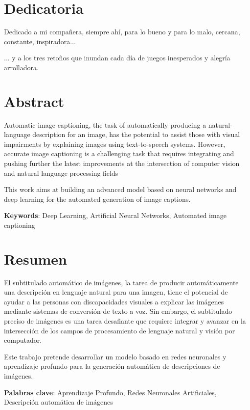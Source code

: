 \chapter*{Dedicatoria}

Dedicado a mi compañera, siempre ahí, para lo bueno y para lo malo, cercana, constante, inspiradora...

... y a los tres retoños que inundan cada día de juegos inesperados y alegría arrolladora.



\chapter*{Abstract}

\onehalfspacing

Automatic image captioning, the task of automatically producing a natural-language description for an image, has the potential to assist those with visual impairments by explaining images using text-to-speech systems. However, accurate image captioning is a challenging task that requires integrating and pushing further the latest improvements at the intersection of computer vision and natural language processing fields

This work aims at building an advanced model based on neural networks and deep learning for the automated generation of image captions. 


\vspace{1.5cm}

\textbf{Keywords}: Deep Learning, Artificial Neural Networks, Automated image captioning


\chapter*{Resumen}

\onehalfspacing

El subtitulado automático de imágenes, la tarea de producir automáticamente una descripción en lenguaje natural para una imagen, tiene el potencial de ayudar a las personas con discapacidades visuales a explicar las imágenes mediante sistemas de conversión de texto a voz. Sin embargo, el subtitulado preciso de imágenes es una tarea desafiante que requiere integrar y avanzar en la intersección de los campos de procesamiento de lenguaje natural y visión por computador.

Este trabajo pretende desarrollar un modelo basado en redes neuronales y aprendizaje profundo para la generación automática de descripciones de imágenes.


\vspace{1.5cm}

\textbf{Palabras clave}: Aprendizaje Profundo, Redes Neuronales Artificiales, Descripción automática de imágenes